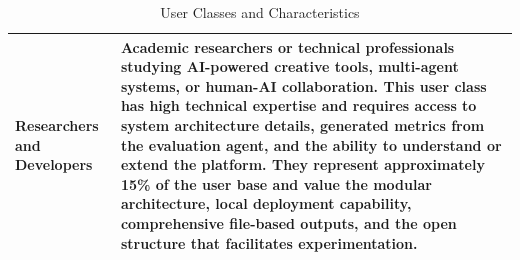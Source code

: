 \begin{table}[h]
\begin{tabular}{p{} p{}}
Researchers and Developers & Academic researchers or technical professionals studying AI-powered creative tools, multi-agent systems, or human-AI collaboration. This user class has high technical expertise and requires access to system architecture details, generated metrics from the evaluation agent, and the ability to understand or extend the platform. They represent approximately 15\% of the user base and value the modular architecture, local deployment capability, comprehensive file-based outputs, and the open structure that facilitates experimentation. \\ \hline
\end{tabular}
\caption{User Classes and Characteristics}
\label{table:user-classes}
\end{table}

\clearpage
